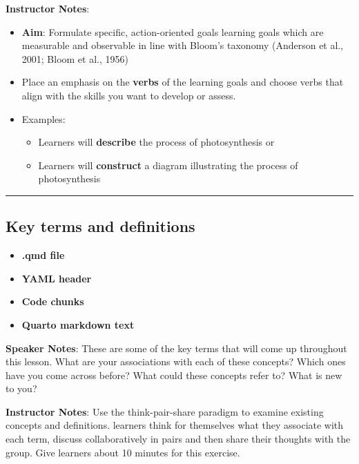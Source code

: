 \documentclass[
  letterpaper,
  DIV=11,
  numbers=noendperiod]{scrartcl}
\providecommand{\tightlist}{%
  \setlength{\itemsep}{0pt}\setlength{\parskip}{0pt}}
\begin{document}
\textbf{Instructor Notes}:

\begin{itemize}
\item
  \textbf{Aim}: Formulate specific, action-oriented goals learning goals
  which are measurable and observable in line with Bloom's taxonomy
  (Anderson et al., 2001; Bloom et al., 1956)
\item
  Place an emphasis on the \textbf{verbs} of the learning goals and
  choose verbs that align with the skills you want to develop or assess.
\item
  Examples:

  \begin{itemize}
  \tightlist
  \item
    Learners will \textbf{describe} the process of photosynthesis or
  \item
    Learners will \textbf{construct} a diagram illustrating the process
    of photosynthesis
  \end{itemize}
\end{itemize}

\begin{center}\rule{0.5\linewidth}{0.5pt}\end{center}

\subsection{Key terms and definitions}\label{key-terms-and-definitions}

\begin{itemize}
\tightlist
\item
  \textbf{.qmd file}
\item
  \textbf{YAML header}
\item
  \textbf{Code chunks}
\item
  \textbf{Quarto markdown text}
\end{itemize}

\textbf{Speaker Notes}: These are some of the key terms that will come
up throughout this lesson. What are your associations with each of these
concepts? Which ones have you come across before? What could these
concepts refer to? What is new to you?

\textbf{Instructor Notes}: Use the think-pair-share paradigm to examine
existing concepts and definitions. learners think for themselves what
they associate with each term, discuss collaboratively in pairs and then
share their thoughts with the group. Give learners about 10 minutes for
this exercise.
\end{document}
